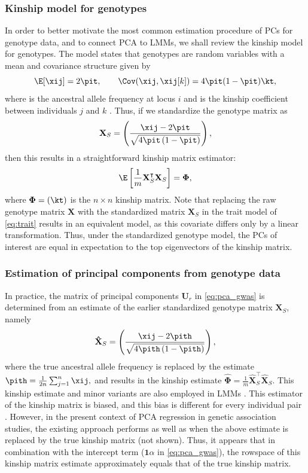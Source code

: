 \documentclass[11pt]{article}
\begin{document}
\subsubsection{Kinship model for genotypes}

In order to better motivate the most common estimation procedure of PCs for genotype data, and to connect PCA to LMMs, we shall review the kinship model for genotypes.
The model states that genotypes are random variables with a mean and covariance structure given by
$$
\E[ \xij ]
=
2 \pit,
\quad\quad
\Cov( \xij, \xij[k] )
=
4 \pit ( 1 - \pit ) \kt,
$$
where \pit is the ancestral allele frequency at locus $i$ and \kt is the kinship coefficient between individuals $j$ and $k$ \citep{malecot_mathematiques_1948, wright_genetical_1951, jacquard_structures_1970}.
Thus, if we standardize the genotype matrix as
$$
\mathbf{X}_S
=
\left(
  \frac{
    \xij - 2 \pit
  }{
    \sqrt{4 \pit \left( 1 - \pit \right)}
  }
\right)
,
$$
then this results in a straightforward kinship matrix estimator:
$$
\E
\left[
\frac{1}{m}
\mathbf{X}_S^\intercal
\mathbf{X}_S
\right]
=
\mathbf{\Phi}
,
$$
where $\mathbf{\Phi} = ( \kt )$ is the $n \times n$ kinship matrix.
Note that replacing the raw genotype matrix $\mathbf{X}$ with the standardized matrix $\mathbf{X}_S$ in the trait model of \cref{eq:trait} results in an equivalent model, as this covariate differs only by a linear transformation.
Thus, under the standardized genotype model, the PCs of interest are equal in expectation to the top eigenvectors of the kinship matrix.

\subsubsection{Estimation of principal components from genotype data}

In practice, the matrix of principal components $\mathbf{U}_r$ in \cref{eq:pca_gwas} is determined from an estimate of the earlier standardized genotype matrix $\mathbf{X}_S$, namely
$$
\mathbf{\hat{X}}_S
=
\left(
  \frac{
    \xij - 2 \pith
  }{
    \sqrt{4 \pith \left( 1 - \pith \right)}
  }
\right)
,
$$
where the true ancestral allele frequency \pit is replaced by the estimate
$
\pith = \frac{1}{2n} \sum_{j = 1}^n \xij,
$
and results in the kinship estimate
$
\mathbf{\hat{\Phi}}
=
\frac{1}{m}
\mathbf{\hat{X}}_S^\intercal
\mathbf{\hat{X}}_S
.
$
This kinship estimate and minor variants are also employed in LMMs \citep{yang_gcta:_2011}.
This estimator of the kinship matrix is biased, and this bias is different for every individual pair \citep{ochoa_fst2, ochoa_human}.
However, in the present context of PCA regression in genetic association studies, the existing approach performs as well as when the above estimate is replaced by the true kinship matrix (not shown).
Thus, it appears that in combination with the intercept term ($\mathbf{1} \alpha$ in \cref{eq:pca_gwas}), the rowspace of this kinship matrix estimate approximately equals that of the true kinship matrix.
\end{document}
